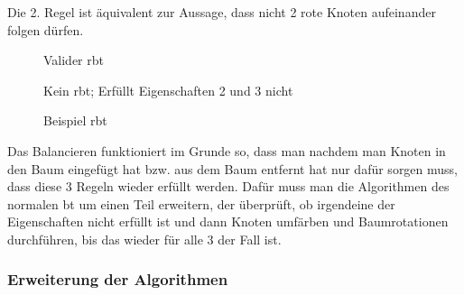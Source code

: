 \documentclass[11pt]{article}
\begin{document}
Die 2. Regel ist äquivalent zur Aussage, dass nicht 2 rote Knoten aufeinander folgen dürfen. \cite[S. 220f]{aic} 

\begin{figure}[h]
\begin{minipage}[t]{.45\linewidth}
  \centering
  \caption{Valider \gls{rbt}}
  \end{minipage}
  \hfill
  \begin{minipage}[t]{.45\linewidth}
  \centering
  \caption{Kein \gls{rbt}; Erfüllt Eigenschaften 2 und 3 nicht}
  \end{minipage}
  
  \caption{Beispiel \gls{rbt}}
\end{figure}
  

Das Balancieren funktioniert im Grunde so, dass man nachdem man Knoten in den Baum eingefügt hat 
bzw. aus dem Baum entfernt hat nur dafür sorgen muss, dass diese 3 Regeln wieder erfüllt werden. 
Dafür muss man die Algorithmen des normalen \gls{bt} um einen Teil erweitern, der überprüft, 
ob irgendeine der Eigenschaften nicht erfüllt ist und dann Knoten umfärben und Baumrotationen durchführen, bis das wieder für alle 3 der Fall ist. 

\subsubsection{Erweiterung der Algorithmen}
\end{document}
